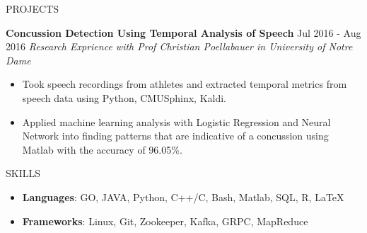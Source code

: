 \documentclass{res}
\begin{document}
\begin{resume}
\begin{section}{PROJECTS}
\vspace{-0.6em}

\textbf{Concussion Detection Using Temporal Analysis of Speech} \hfill {Jul 2016 - Aug 2016}
\textit{Research Exprience with Prof Christian Poellabauer in University of Notre Dame}
\begin{itemize}[leftmargin=0.3in]
\item{Took speech recordings from athletes and extracted temporal metrics from speech data using Python, CMUSphinx, Kaldi.}
\vspace{-0.4em}
\item{Applied machine learning analysis with Logistic Regression and Neural Network into finding patterns that are indicative of a concussion using Matlab with the accuracy of 96.05\%.
}
\end{itemize}

\end{section}

\vspace{-0.5em}

\begin{section}{SKILLS}
\vspace{1.5em}
\fullline
\vspace{0.4em}
\begin{itemize}[leftmargin=0.3in]
\item[] {\textbf{Languages}: GO, JAVA, Python, C++/C, Bash, Matlab, SQL, R, LaTeX} \\
\vspace{-1.7em}
\item[] {\textbf{Frameworks}: Linux, Git, Zookeeper, Kafka, GRPC, MapReduce}
\end{itemize}

\end{section}

\end{resume}
\end{document}
